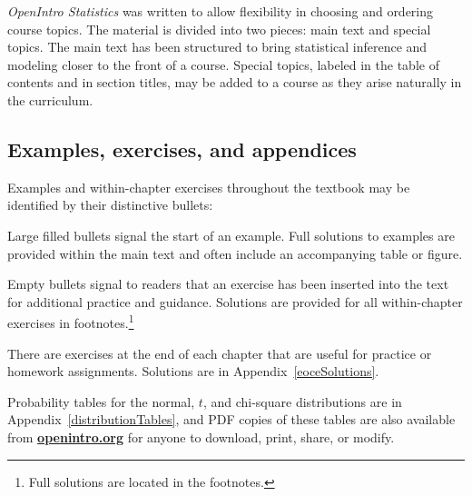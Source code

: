 \emph{OpenIntro Statistics} was written to allow flexibility in choosing and ordering course topics. The material is divided into two pieces: main text and special topics. The main text has been structured to bring statistical inference and modeling closer to the front of a course. Special topics, labeled in the table of contents and in section titles, may be added to a course as they arise naturally in the curriculum.


\subsection*{Examples, exercises, and appendices}

Examples and within-chapter exercises throughout the textbook may be identified by their distinctive bullets:

\begin{example}{Large filled bullets signal the start of an example.}
Full solutions to examples are provided within the main text and often include an accompanying table or figure.
 \end{example}

\begin{exercise}
Empty bullets signal to readers that an exercise has been inserted into the text for additional practice and guidance. Solutions are provided for all within-chapter exercises in footnotes.\footnote{Full solutions are located in the footnotes.}
\end{exercise}

There are exercises at the end of each chapter that are useful for practice or homework assignments. Solutions are in Appendix~\ref{eoceSolutions}. %

Probability tables for the normal, $t$, and chi-square distributions are in Appendix~\ref{distributionTables}, and PDF copies of these tables are also available from \href{http://www.openintro.org}{\color{black}\textbf{openintro.org}} for anyone to download, print, share, or modify.


